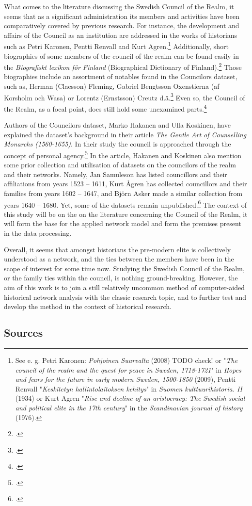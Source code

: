 \documentclass[a4paper,12pt]{article}
\begin{document}
\begin{onehalfspace}
What comes to the literature discussing the Swedish Council of the Realm, it seems that as a significant administration its members and activities have been comparatively covered by previous research. For instance, the development and affairs of the Council as an institution are addressed in the works of historians such as Petri Karonen, Pentti Renvall and Kurt Agren.\footnote{See e. g. Petri Karonen: \textit{Pohjoinen Suurvalta} (2008) TODO check! or "\textit{The council of the realm and the quest for peace in Sweden, 1718-1721}" in \textit{Hopes and fears for the future in early modern Sweden, 1500-1850} (2009), Pentti Renvall "\textit{Keskitetyn hallintolaitoksen kehitys}" in \textit{Suomen kulttuurihistoria. II} (1934) or Kurt Agren "\textit{Rise and decline of an aristocracy: The Swedish social and political elite in the 17th century}" in the \textit{Scandinavian journal of history} (1976).} Additionally, short biographies of some members of the council of the realm can be found easily in the \textit{Biografiskt lexikon för Finland} (Biographical Dictionary of Finland).\footcite{blf} Those biographies include an assortment of notables found in the Councilors dataset, such as, Herman (Claesson) Fleming, Gabriel Bengtsson Oxenstierna (af Korsholm och Wasa) or Lorentz (Ernstsson) Creutz d.ä.\footcite{blf-list} Even so, the Council of the Realm, as a focal point, does still hold some unexamined parts.\footcite[p. 47-48.]{HakanenAKoskinen2017} 

Authors of the Councilors dataset, Marko Hakanen and Ulla Koskinen, have explained the dataset's background in their article \textit{The Gentle Art of Counselling Monarchs (1560-1655)}. In their study the council is approached through the concept of personal agency.\footcite{HakanenAKoskinen2017} In the article, Hakanen and Koskinen also mention some prior collection and utilisation of datasets on the councilors of the realm and their networks. Namely, Jan Samuleson has listed councillors and their affiliations from years 1523 – 1611, Kurt Ågren has collected councillors and their families from years 1602 – 1647, and Björn Asker made a similar collection from years 1640 – 1680. Yet, some of the datasets remain unpublished.\footcite[p. 48, 67 (cite 4).]{HakanenAKoskinen2017} The context of this study will be on the on the literature concerning the Council of the Realm, it will form the base for the applied network model and form the premises present in the data processing. 
 
Overall, it seems that amongst historians the pre-modern elite is collectively understood as a network, and the ties between the members have been in the scope of interest for some time now. Studying the Swedish Council of the Realm, or the family ties within the council, is nothing ground-breaking. However, the aim of this work is to join a still relatively uncommon method of computer-aided historical network analysis with the classic research topic, and to further test and develop the method in the context of historical research. 

\subsection{Sources}
\end{onehalfspace}
\end{document}
